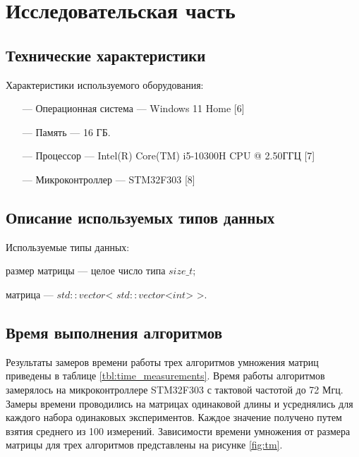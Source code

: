 \chapter{Исследовательская часть}

\section{Технические характеристики}
Характеристики используемого оборудования:
\begin{itemize}
    \item[---] Операционная система --- Windows 11 Home [6]
    \item[---] Память --- 16 ГБ.
    \item[---] Процессор --- Intel(R) Core(TM) i5-10300H CPU @ 2.50ГГЦ [7]
    \item[---] Микроконтроллер --- STM32F303 [8]
\end{itemize}

\section{Описание используемых типов данных}
Используемые типы данных:

размер матрицы --- целое число типа $size\_t$;

матрица --- $std::vector$< $std::vector$<$int$> >.


\clearpage

\section{Время выполнения алгоритмов}
Результаты замеров времени работы трех алгоритмов умножения матриц приведены в таблице \ref{tbl:time_measurements}. Время работы алгоритмов замерялось на микроконтроллере STM32F303 с тактовой частотой до 72 Мгц. Замеры времени проводились на матрицах одинаковой длины и усреднялись для каждого набора одинаковых экспериментов. Каждое значение получено путем взятия среднего из 100 измерений. Зависимости времени умножения от размера матрицы для трех алгоритмов представлены на рисунке \ref{fig:tm}.

